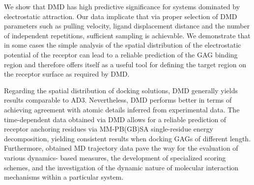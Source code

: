 We show that DMD has high predictive significance for systems dominated by
electrostatic attraction. Our data implicate that via proper selection of DMD
parameters such as pulling velocity, ligand displacement distance and the number
of independent repetitions, sufficient sampling is achievable. We demonstrate
that in some cases the simple analysis of the spatial distribution of the
electrostatic potential of the receptor can lead to a reliable prediction of the
GAG binding region and therefore offers itself as a useful tool for defining the
target region on the receptor surface as required by DMD.

Regarding the spatial distribution of docking solutions, DMD generally yields
results comparable to AD3. Nevertheless, DMD performs better in terms of
achieving agreement with atomic details inferred from experimental data. The
time-dependent data obtained via DMD allows for a reliable prediction of
receptor anchoring residues via MM-PB(GB)SA single-residue energy decomposition,
yielding consistent results when docking GAGs of different length. Furthermore,
obtained MD trajectory data pave the way for the evaluation of various dynamics-
based measures, the development of specialized scoring schemes, and the
investigation of the dynamic nature of molecular interaction mechanisms within a
particular system.
